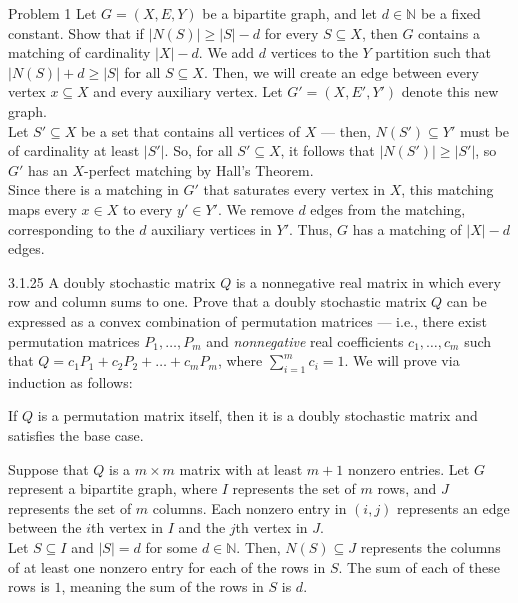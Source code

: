 \documentclass[10pt]{extarticle}
\title{}
\author{Avinash Iyer}
\date{}
\begin{document}
{
  \begin{problem}{Problem 1}
    Let $G = (X,E,Y)$ be a bipartite graph, and let $d\in \mathbb{N}$ be a fixed constant. Show that if $|N(S)| \geq |S|-d$ for every $S\subseteq X$, then $G$ contains a matching of cardinality $|X|-d$.
    \tcblower
    We add $d$ vertices to the $Y$ partition such that $|N(S)| + d \geq |S|$ for all $S\subseteq X$. Then, we will create an edge between every vertex $x\subseteq X$ and every auxiliary vertex. Let $G' = (X,E',Y')$ denote this new graph.\\

    Let $S'\subseteq X$ be a set that contains all vertices of $X$ --- then, $N(S') \subseteq Y'$ must be of cardinality at least $|S'|$. So, for all $S'\subseteq X$, it follows that $|N(S')| \geq |S'|$, so $G'$ has an $X$-perfect matching by Hall's Theorem.\\

    Since there is a matching in $G'$ that saturates every vertex in $X$, this matching maps every $x\in X$ to every $y'\in Y'$. We remove $d$ edges from the matching, corresponding to the $d$ auxiliary vertices in $Y'$. Thus, $G$ has a matching of $|X|-d$ edges.
  \end{problem}
  \begin{problem}{3.1.25}
    A doubly stochastic matrix $Q$ is a nonnegative real matrix in which every row and column sums to one. Prove that a doubly stochastic matrix $Q$ can be expressed as a convex combination of permutation matrices --- i.e., there exist permutation matrices $P_1,\dots,P_m$ and \textit{nonnegative} real coefficients $c_1,\dots,c_m$ such that $Q = c_1P_1 + c_2P_2 + \dots + c_mP_m$, where $\sum_{i = 1}^{m} c_i = 1$.
    \tcblower
    We will prove via induction as follows:
    \begin{description}[font = \normalfont\scshape]
      \item[Base Case] If $Q$ is a permutation matrix itself, then it is a doubly stochastic matrix and satisfies the base case.
      \item[Inductive Step] Suppose that $Q$ is a $m\times m$ matrix with at least $m+1$ nonzero entries. Let $G$ represent a bipartite graph, where $I$ represents the set of $m$ rows, and $J$ represents the set of $m$ columns. Each nonzero entry in $(i,j)$ represents an edge between the $i$th vertex in $I$ and the $j$th vertex in $J$.\\

        Let $S\subseteq I$ and $|S| = d$ for some $d\in \mathbb{N}$. Then, $N(S) \subseteq J$ represents the columns of at least one nonzero entry for each of the rows in $S$. The sum of each of these rows is $1$, meaning the sum of the rows in $S$ is $d$.\\


\end{description}
\end{problem}}
\end{document}
